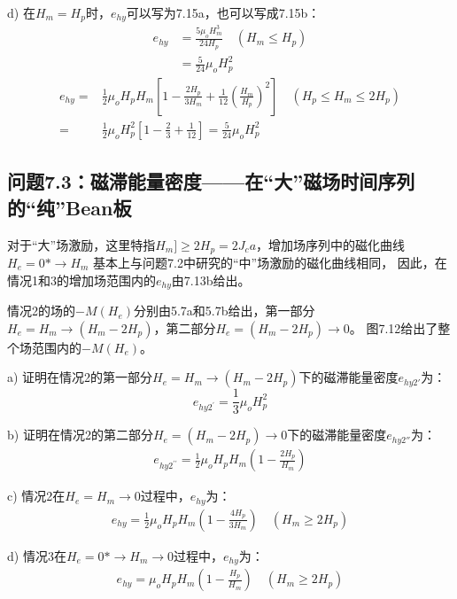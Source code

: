 d) 在$H_m=H_p$时，$e_{hy}$可以写为7.15a，也可以写成7.15b：
\begin{align*}%
e_{hy}&=\frac{5\mu_oH_{m}^{3}}{24H_p} \quad (H_m\leq H_p) \\ \tag{71.5a}
&=\frac{5}{24}\mu_oH_{p}^{2}
\end{align*}
\begin{align*}%
e_{hy}=&\frac{1}{2}\mu_oH_pH_m\left[1-\frac{2H_p}{3H_m}+\frac{1}{12}\left(\frac{H_m}{H_p}\right)^2\right] \quad  (H_p\leq H_m\leq 2H_p) \\\tag{7.15b}
=&\frac{1}{2}\mu_oH_{p}^{2}\left[1-\frac{2}{3}+\frac{1}{12}\right]=\frac{5}{24}\mu_oH_{p}^{2}
\end{align*}


\subsection{问题7.3：磁滞能量密度——在“大”磁场时间序列的“纯”Bean板}
对于“大”场激励，这里特指$H_m]\ge 2H_p= 2J_c a$，增加场序列中的磁化曲线$H_e = 0*\rightarrow H_m$
基本上与问题7.2中研究的“中”场激励的磁化曲线相同， 因此，在情况1和3的增加场范围内的$e_{hy}$由7.13b给出。

情况2的场的$-M(H_e)$分别由5.7a和5.7b给出，第一部分$H_e = H_m\rightarrow (H_m-2H_p)$，第二部分$H_e=(H_m-2H_p)\rightarrow 0$。
图7.12给出了整个场范围内的$-M(H_e)$。

a) 证明在情况2的第一部分$H_e = H_m\rightarrow (H_m-2H_p)$下的磁滞能量密度$e_{hy2'}$为：
\begin{equation}%
e_{hy2^\prime}=\frac{1}{3}\mu_oH_{p}^{2}
\end{equation}

b) 证明在情况2的第二部分$H_e=(H_m-2H_p)\rightarrow 0$下的磁滞能量密度$e_{hy2''}$为：
\begin{align*}%
e_{hy2^{\prime\prime}}=\frac{1}{2}\mu_oH_pH_m\left(1-\frac{2H_p}{H_m}\right) \tag{7.16b}
\end{align*}

c) 情况2在$H_e=H_m\rightarrow 0$过程中，$e_{hy}$为：
\begin{align*}%
e_{hy}=\frac{1}{2}\mu_oH_pH_m\left(1-\frac{4H_p}{3H_m}\right)  \quad   (H_m\geq 2H_p) \tag{7.14b}
\end{align*}

d) 情况3在$H_e=0*\rightarrow H_m\rightarrow 0$过程中，$e_{hy}$为：
\begin{align*}%
e_{hy}=\mu_oH_pH_m\left(1-\frac{H_p}{H_m}\right) \quad   (H_m\geq 2H_p)
\end{align*}

